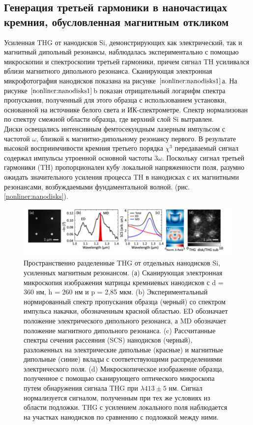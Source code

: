 \subsection*{Генерация третьей гармоники в наночастицах кремния, обусловленная магнитным откликом}
\hspace*{2mm}Усиленная THG от нанодисков Si, демонстрирующих как электрический, так и магнитный дипольный резонансы, наблюдалась экспериментально \cite{shcherbakov2014enhanced} с помощью микроскопии и спектроскопии третьей гармоники, причем сигнал TH усиливался вблизи магнитного дипольного резонанса. Сканирующая электронная микрофотография нанодисков показана на рисунке $\ref{nonliner:nanodisks1}$а. На рисунке $\ref{nonliner:nanodisks1}$b показан отрицательный логарифм спектра пропускания, полученный для этого образца с использованием установки, основанной на источнике белого света и ИК-спектрометре. Спектр нормализован по спектру смежной области образца, где верхний слой Si вытравлен. 
\\
\hspace*{2mm}
Диски освещались интенсивным фемтосекундным лазерным импульсом с частотой $\omega$, близкой к магнитно-дипольному резонансу первого. В результате высокой восприимчивости кремния третьего порядка $\chi^3$ передаваемый сигнал содержал импульсы утроенной основной частоты $3\omega$. Поскольку сигнал третьей гармоники (TH) пропорционален кубу локальной напряженности поля, разумно ожидать значительного усиления процесса TH в нанодисках с их магнитными резонансами, возбуждаемыми фундаментальной волной. (рис. \ref{nonliner:nanodisks}). 
  \begin{figure}[h!]
	\centering
	\includegraphics[width=1\linewidth]{images/fig4.png}
	\caption{Пространственно разделенные THG от отдельных нанодисков Si, усиленных магнитным резонансом. (а) Сканирующая электронная микроскопия изображения матрицы кремниевых нанодисков с d = 360 нм, h = 260 нм и p = 2,85 мкм. (b) Экспериментальный нормированный спектр пропускания образца (черный) со спектром импульса накачки, обозначенным красной областью. ED обозначает положение электрического дипольного резонанса, а MD обозначает положение магнитного дипольного резонанса. (c) Рассчитанные спектры сечения рассеяния (SCS) нанодисков (черный), разложенных на электрические дипольные (красные) и магнитные дипольные (синие) вклады с соответствующими распределениями электрического поля. (d) Микроскопическое изображение образца, полученное с помощью сканирующего оптического микроскопа путем обнаружения сигнала THG при $\lambda 413 \pm 5$ нм. Сигнал нормализуется сигналом, полученным при тех же условиях из области подложки. THG с усилением локального поля наблюдается на участках нанодисков по сравнению с подложкой между ними.}
	\label{nonliner:nanodisks1}
\end{figure}

